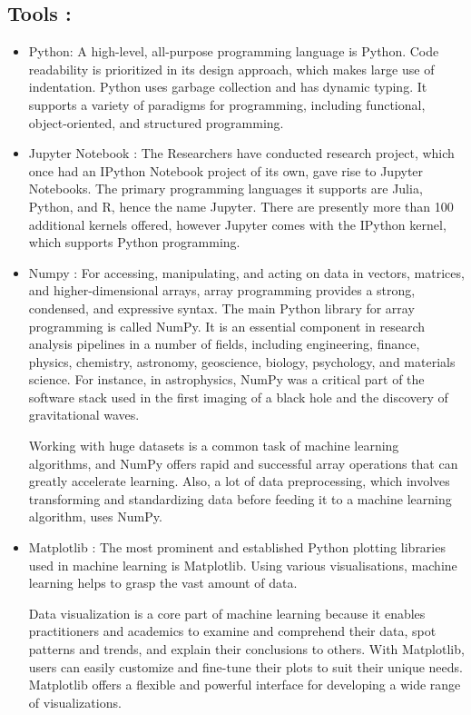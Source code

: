 \documentclass{article}
\begin{document}
\subsection{Tools : }
\begin{itemize}
  \item Python: A high-level, all-purpose programming language is Python. Code readability is prioritized in its design approach, which makes large use of indentation. Python uses garbage collection and has dynamic typing. It supports a variety of paradigms for programming, including functional, object-oriented, and structured programming.
  \item Jupyter Notebook : The Researchers have conducted research project, which once had an IPython Notebook project of its own, gave rise to Jupyter Notebooks. The primary programming languages it supports are Julia, Python, and R, hence the name Jupyter. There are presently more than 100 additional kernels offered, however Jupyter comes with the IPython kernel, which supports Python programming.
  \item Numpy : For accessing, manipulating, and acting on data in vectors, matrices, and higher-dimensional arrays, array programming provides a strong, condensed, and expressive syntax. The main Python library for array programming is called NumPy. It is an essential component in research analysis pipelines in a number of fields, including engineering, finance, physics, chemistry, astronomy, geoscience, biology, psychology, and materials science. For instance, in astrophysics, NumPy was a critical part of the software stack used in the first imaging of a black hole and the discovery of gravitational waves.
  
  Working with huge datasets is a common task of machine learning algorithms, and NumPy offers rapid and successful array operations that can greatly accelerate learning. Also, a lot of data preprocessing, which involves transforming and standardizing data before feeding it to a machine learning algorithm, uses NumPy.
  \item Matplotlib : The most prominent and established Python plotting libraries used in machine learning is Matplotlib. Using various visualisations, machine learning helps to grasp the vast amount of data.

Data visualization is a core part of machine learning because it enables practitioners and academics to examine and comprehend their data, spot patterns and trends, and explain their conclusions to others. With Matplotlib, users can easily customize and fine-tune their plots to suit their unique needs. Matplotlib offers a flexible and powerful interface for developing a wide range of visualizations.


\end{itemize}
\end{document}
